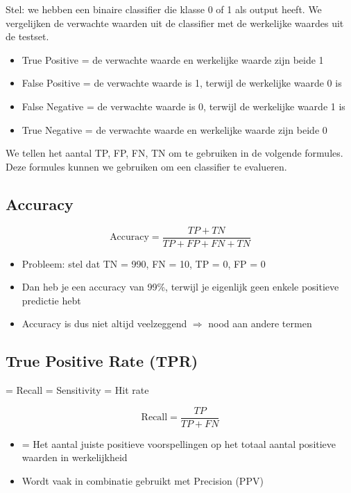\documentclass{article}
\begin{document}
Stel: we hebben een binaire classifier die klasse 0 of 1 als output heeft.
We vergelijken de verwachte waarden uit de classifier met de werkelijke waardes uit de testset.

\begin{itemize}
    \item True Positive = de verwachte waarde en werkelijke waarde zijn beide 1
    \item False Positive = de verwachte waarde is 1, terwijl de werkelijke waarde 0 is
    \item False Negative = de verwachte waarde is 0, terwijl de werkelijke waarde 1 is
    \item True Negative = de verwachte waarde en werkelijke waarde zijn beide 0
\end{itemize}

We tellen het aantal TP, FP, FN, TN om te gebruiken in de volgende formules. 
Deze formules kunnen we gebruiken om een classifier te evalueren.

\subsection{Accuracy}

\begin{equation}
    \text{Accuracy} = \frac{TP + TN}{TP + FP + FN + TN}
\end{equation}

\begin{itemize}
    \item Probleem: stel dat TN = 990, FN = 10, TP = 0, FP = 0
    \item Dan heb je een accuracy van 99\%, terwijl je eigenlijk geen enkele positieve predictie hebt
    \item Accuracy is dus niet altijd veelzeggend $\Rightarrow$ nood aan andere termen
\end{itemize}

\subsection{True Positive Rate (TPR)}

= Recall = Sensitivity = Hit rate

\begin{equation}
    \text{Recall} = \frac{TP}{TP + FN}
\end{equation}

\begin{itemize}
    \item = Het aantal juiste positieve voorspellingen op het totaal aantal positieve waarden in werkelijkheid
    \item Wordt vaak in combinatie gebruikt met Precision (PPV)
\end{itemize}
\end{document}
